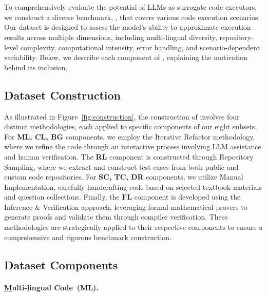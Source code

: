 \section{\bench}

To comprehensively evaluate the potential of LLMs as surrogate code executors, we construct a diverse benchmark, \bench, that covers various code execution scenarios. Our dataset is designed to assess the model’s ability to approximate execution results across multiple dimensions, including multi-lingual diversity, repository-level complexity, computational intensity, error handling, and scenario-dependent variability. Below, we describe each component of \bench, explaining the motivation behind its inclusion.

\subsection{Dataset Construction}
\label{sec:dc}

As illustrated in Figure~\ref{fig:construction}, the construction of \bench involves four distinct methodologies, each applied to specific components of our eight subsets. For \textbf{ML, CL, BG} components, we employ the Iterative Refactor methodology, where we refine the code through an interactive process involving LLM assistance and human verification. The \textbf{RL} component is constructed through Repository Sampling, where we extract and construct test cases from both public and custom code repositories. For \textbf{SC, TC, DR} components, we utilize Manual Implementation, carefully handcrafting code based on selected textbook materials and question collections. Finally, the \textbf{FL} component is developed using the Inference \& Verification approach, leveraging formal mathematical provers to generate proofs and validate them through compiler verification. These methodologies are strategically applied to their respective components to ensure a comprehensive and rigorous benchmark construction.


\subsection{Dataset Components}

\paragraph{\underline{M}ulti-\underline{l}ingual Code~(ML).}

